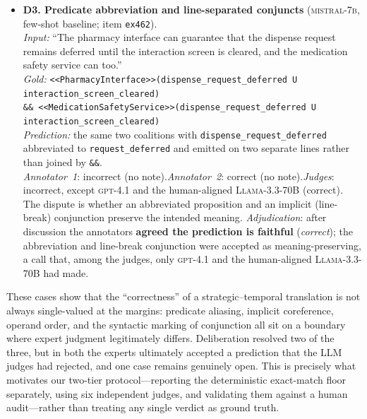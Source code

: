 \documentclass[letterpaper]{article}
\begin{document}
{\begin{itemize}[leftmargin=1.3em,itemsep=7pt]
  Every \texttt{U} has its two operands transposed (and one predicate altered), which annotator~1 read as inverting the temporal commitment; the dispute is how strictly operand order must be enforced. \emph{Adjudication}: after discussion the annotators \textbf{agreed the prediction is faithful} (\emph{correct}), overturning the stricter initial label and the six judges' unanimous incorrect verdict.
  \item \textbf{D3. Predicate abbreviation and line-separated conjuncts} (\textsc{mistral-7b}, few-shot baseline; item \texttt{ex462}).\\
  \emph{Input:} ``The pharmacy interface can guarantee that the dispense request remains deferred until the interaction screen is cleared, and the medication safety service can too.''\\
  \emph{Gold:} \texttt{<<PharmacyInterface>>(dispense\_request\_deferred U interaction\_screen\_cleared)}\\
  \texttt{\&\& <<MedicationSafetyService>>(dispense\_request\_deferred U interaction\_screen\_cleared)}\\
  \emph{Prediction:} the same two coalitions with \texttt{dispense\_request\_deferred} abbreviated to \texttt{request\_deferred} and emitted on two separate lines rather than joined by \texttt{\&\&}.\\
  \emph{Annotator~1}: incorrect (no note).\quad\emph{Annotator~2}: correct (no note).\quad\emph{Judges}: incorrect, except \textsc{gpt-4.1} and the human-aligned \textsc{Llama-3.3-70B} (correct).\\
  The dispute is whether an abbreviated proposition and an implicit (line-break) conjunction preserve the intended meaning. \emph{Adjudication}: after discussion the annotators \textbf{agreed the prediction is faithful} (\emph{correct}); the abbreviation and line-break conjunction were accepted as meaning-preserving, a call that, among the judges, only \textsc{gpt-4.1} and the human-aligned \textsc{Llama-3.3-70B} had made.
\end{itemize}
}

\noindent These cases show that the ``correctness'' of a strategic--temporal translation is not always single-valued at the margins: predicate aliasing, implicit coreference, operand order, and the syntactic marking of conjunction all sit on a boundary where expert judgment legitimately differs. Deliberation resolved two of the three, but in both the experts ultimately accepted a prediction that the LLM judges had rejected, and one case remains genuinely open. This is precisely what motivates our two-tier protocol---reporting the deterministic exact-match floor separately, using six independent judges, and validating them against a human audit---rather than treating any single verdict as ground truth.
\end{document}
